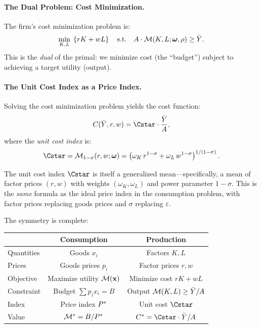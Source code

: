 \paragraph{The Dual Problem: Cost Minimization.}
The firm's cost minimization problem is:
\begin{equation}
\min_{K, L} \; \left\{ rK + wL \right\} \quad \text{s.t.} \quad A \cdot \mathcal{M}(K, L; \boldsymbol{\omega}, \rho) \geq \bar{Y}.
\label{eq:dual-cost}
\end{equation}
This is the \emph{dual} of the primal: we minimize cost (the ``budget'') subject to achieving a target utility (output).

\paragraph{The Unit Cost Index as a Price Index.}
Solving the cost minimization problem yields the cost function:
\begin{equation}
C(\bar{Y}, r, w) = \Cstar \cdot \frac{\bar{Y}}{A},
\label{eq:cost-function}
\end{equation}
where the \emph{unit cost index} is:
\begin{equation}
\Cstar = \M_{1-\sigma}(r, w; \bom) = \left( \omega_K \, r^{1-\sigma} + \omega_L \, w^{1-\sigma} \right)^{1/(1-\sigma)}.
\label{eq:unit-cost-as-mean}
\end{equation}

\begin{calloutimportant}
The unit cost index $\Cstar$ is itself a generalized mean---specifically, a mean of factor prices $(r, w)$ with weights $(\omega_K, \omega_L)$ and power parameter $1 - \sigma$. This is the \emph{same} formula as the ideal price index in the consumption problem, with factor prices replacing goods prices and $\sigma$ replacing $\varepsilon$.

The symmetry is complete:
\begin{center}
\renewcommand{\arraystretch}{1.3}
\begin{tabular}{@{}lcc@{}}
\toprule
& \textbf{Consumption} & \textbf{Production} \\
\midrule
Quantities & Goods $x_i$ & Factors $K, L$ \\
Prices & Goods prices $p_i$ & Factor prices $r, w$ \\
Objective & Maximize utility $\mathcal{M}(\mathbf{x})$ & Minimize cost $rK + wL$ \\
Constraint & Budget $\sum p_i x_i = B$ & Output $\mathcal{M}(K,L) \geq \bar{Y}/A$ \\
Index & Price index $P^{*}$ & Unit cost $\Cstar$ \\
Value & $\mathcal{M}^* = B/P^{*}$ & $C^* = \Cstar \cdot \bar{Y}/A$ \\
\bottomrule
\end{tabular}
\end{center}
\end{calloutimportant}

